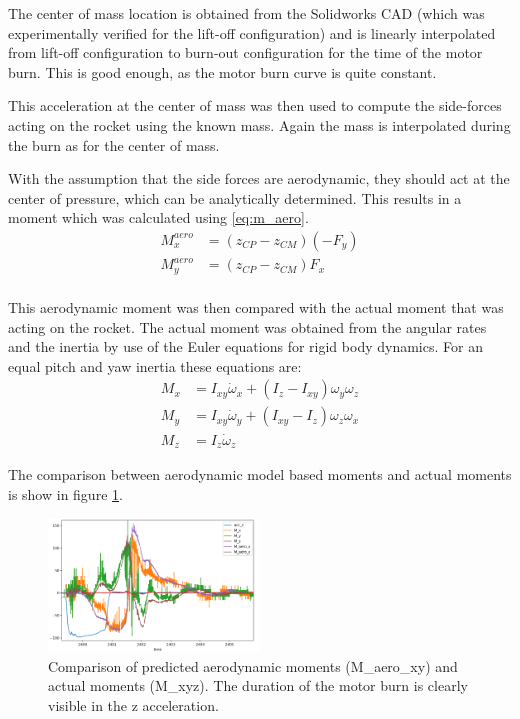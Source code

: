 The center of mass location is obtained from the Solidworks CAD (which was experimentally verified for the lift-off configuration) and is linearly interpolated from lift-off configuration to burn-out configuration for the time of the motor burn. This is good enough, as the motor burn curve is quite constant.

This acceleration at the center of mass was then used to compute the side-forces acting on the rocket using the known mass. Again the mass is interpolated during the burn as for the center of mass.

With the assumption that the side forces are aerodynamic, they should act at the center of pressure, which can be analytically determined.
This results in a moment which was calculated using \ref{eq:m_aero}.
\begin{equation}
\label{eq:m_aero}
\begin{split}
    M^{aero}_x &= (z_{CP} - z_{CM}) (-F_y) \\
    M^{aero}_y &= (z_{CP} - z_{CM}) F_x \\
\end{split}
\end{equation}

This aerodynamic moment was then compared with the actual moment that was acting on the rocket.
The actual moment was obtained from the angular rates and the inertia by use of the Euler equations for rigid body dynamics. For an equal pitch and yaw inertia these equations are:
\begin{equation}
\begin{split}
    M_x &= I_{xy} \dot\omega_x + (I_z-I_{xy}) \omega_y \omega_z \\
    M_y &= I_{xy} \dot\omega_y + (I_{xy}-I_z) \omega_z \omega_x \\
    M_z &= I_{z} \dot\omega_z
\end{split}
\end{equation}


The comparison between aerodynamic model based moments and actual moments is show in figure \ref{fig:test_flight_graph}.
\begin{figure}[h!]
    \centering
        \includegraphics[width=0.5\textwidth]{img/test_flight_graph.png}
        \caption{Comparison of predicted aerodynamic moments (M_aero_xy) and actual moments (M_xyz). The duration of the motor burn is clearly visible in the z acceleration.}
        \label{fig:test_flight_graph}
 \end{figure}

